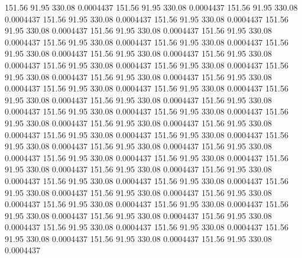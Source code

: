  151.56   91.95  330.08   0.0004437
 151.56   91.95  330.08   0.0004437
 151.56   91.95  330.08   0.0004437
 151.56   91.95  330.08   0.0004437
 151.56   91.95  330.08   0.0004437
 151.56   91.95  330.08   0.0004437
 151.56   91.95  330.08   0.0004437
 151.56   91.95  330.08   0.0004437
 151.56   91.95  330.08   0.0004437
 151.56   91.95  330.08   0.0004437
 151.56   91.95  330.08   0.0004437
 151.56   91.95  330.08   0.0004437
 151.56   91.95  330.08   0.0004437
 151.56   91.95  330.08   0.0004437
 151.56   91.95  330.08   0.0004437
 151.56   91.95  330.08   0.0004437
 151.56   91.95  330.08   0.0004437
 151.56   91.95  330.08   0.0004437
 151.56   91.95  330.08   0.0004437
 151.56   91.95  330.08   0.0004437
 151.56   91.95  330.08   0.0004437
 151.56   91.95  330.08   0.0004437
 151.56   91.95  330.08   0.0004437
 151.56   91.95  330.08   0.0004437
 151.56   91.95  330.08   0.0004437
 151.56   91.95  330.08   0.0004437
 151.56   91.95  330.08   0.0004437
 151.56   91.95  330.08   0.0004437
 151.56   91.95  330.08   0.0004437
 151.56   91.95  330.08   0.0004437
 151.56   91.95  330.08   0.0004437
 151.56   91.95  330.08   0.0004437
 151.56   91.95  330.08   0.0004437
 151.56   91.95  330.08   0.0004437
 151.56   91.95  330.08   0.0004437
 151.56   91.95  330.08   0.0004437
 151.56   91.95  330.08   0.0004437
 151.56   91.95  330.08   0.0004437
 151.56   91.95  330.08   0.0004437
 151.56   91.95  330.08   0.0004437
 151.56   91.95  330.08   0.0004437
 151.56   91.95  330.08   0.0004437
 151.56   91.95  330.08   0.0004437
 151.56   91.95  330.08   0.0004437
 151.56   91.95  330.08   0.0004437
 151.56   91.95  330.08   0.0004437
 151.56   91.95  330.08   0.0004437
 151.56   91.95  330.08   0.0004437
 151.56   91.95  330.08   0.0004437
 151.56   91.95  330.08   0.0004437
 151.56   91.95  330.08   0.0004437
 151.56   91.95  330.08   0.0004437
 151.56   91.95  330.08   0.0004437
